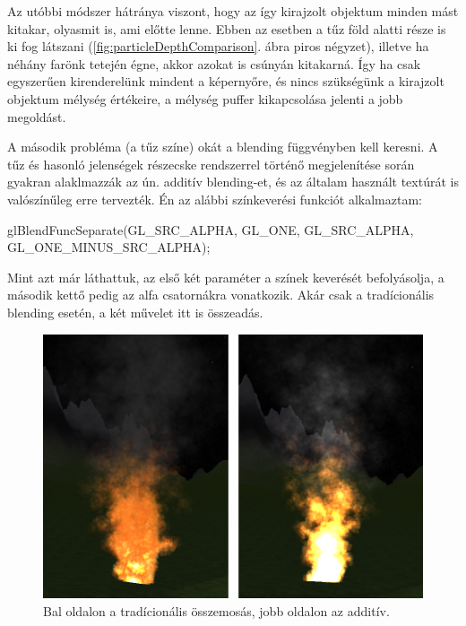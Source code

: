 Az utóbbi módszer hátránya viszont, hogy az így kirajzolt objektum minden mást kitakar, olyasmit is, ami előtte lenne. Ebben az esetben a tűz föld alatti része is ki fog látszani (\ref{fig:particleDepthComparison}. ábra piros négyzet), illetve ha néhány farönk tetején égne, akkor azokat is csúnyán kitakarná. Így ha csak egyszerűen kirenderelünk mindent a képernyőre, és nincs szükségünk a kirajzolt objektum mélység értékeire, a mélység puffer kikapcsolása jelenti a jobb megoldást.


A második probléma (a tűz színe) okát a blending függvényben kell keresni. A tűz és hasonló jelenségek részecske rendszerrel történő megjelenítése során gyakran alaklmazzák az ún. additív blending-et, és az általam használt textúrát is valószínűleg erre tervezték. Én az alábbi színkeverési funkciót alkalmaztam: 
\begin{cpp}
glBlendFuncSeparate(GL_SRC_ALPHA, GL_ONE, 
		    GL_SRC_ALPHA, GL_ONE_MINUS_SRC_ALPHA);
\end{cpp}
Mint azt már láthattuk, az első két paraméter a színek keverését befolyásolja, a második kettő pedig az alfa csatornákra vonatkozik. Akár csak a tradícionális blending esetén, a két művelet itt is összeadás. 
\begin{figure}[h]
 \centering
 \includegraphics[width=\textwidth]{kepek/particleBlendingComparison.png}
 \caption{Bal oldalon a tradícionális összemosás, jobb oldalon az additív.}
 \label{fig:particleBlendingComparison}
\end{figure}

